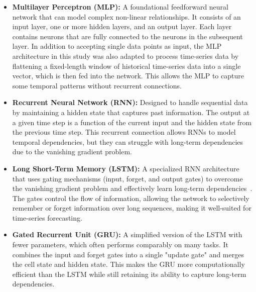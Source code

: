 \documentclass[a4paper]{article}
\begin{document}
\begin{itemize}
    \item \textbf{Multilayer Perceptron (MLP):} A foundational feedforward neural network that can model complex non-linear relationships. It consists of an input layer, one or more hidden layers, and an output layer. Each layer contains neurons that are fully connected to the neurons in the subsequent layer. In addition to accepting single data points as input, the MLP architecture in this study was also adapted to process time-series data by flattening a fixed-length window of historical time-series data into a single vector, which is then fed into the network. This allows the MLP to capture some temporal patterns without recurrent connections.
    
    \item \textbf{Recurrent Neural Network (RNN):} Designed to handle sequential data by maintaining a hidden state that captures past information. The output at a given time step is a function of the current input and the hidden state from the previous time step. This recurrent connection allows RNNs to model temporal dependencies, but they can struggle with long-term dependencies due to the vanishing gradient problem.
    
    \item \textbf{Long Short-Term Memory (LSTM):} A specialized RNN architecture that uses gating mechanisms (input, forget, and output gates) to overcome the vanishing gradient problem and effectively learn long-term dependencies~\cite{hochreiter1997long}. The gates control the flow of information, allowing the network to selectively remember or forget information over long sequences, making it well-suited for time-series forecasting.
    
    \item \textbf{Gated Recurrent Unit (GRU):} A simplified version of the LSTM with fewer parameters, which often performs comparably on many tasks. It combines the input and forget gates into a single "update gate" and merges the cell state and hidden state. This makes the GRU more computationally efficient than the LSTM while still retaining its ability to capture long-term dependencies.
    

\end{itemize}
\end{document}
